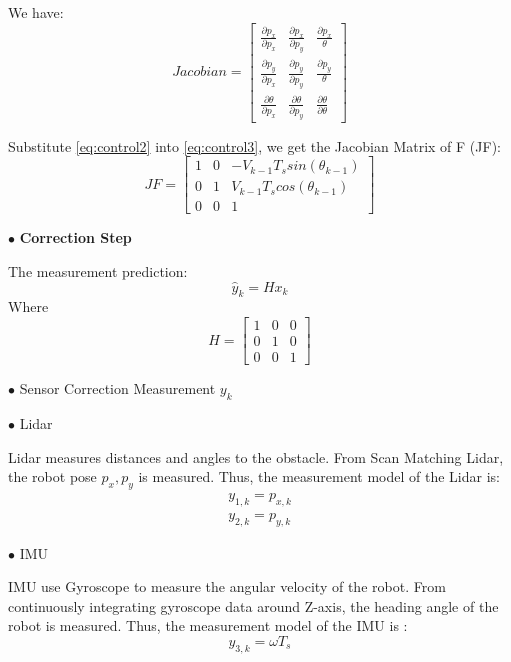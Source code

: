 We have:
\begin{equation} \label{eq:control3}
Jacobian = \begin{bmatrix}
\frac{\partial p_x}{\partial p_x} & \frac{\partial p_x}{\partial p_y} & \frac{\partial p_x}{\theta}\\
\frac{\partial p_y}{\partial p_x} & \frac{\partial p_y}{\partial p_y} & \frac{\partial p_y}{\theta}\\
\frac{\partial \theta}{\partial p_x}       & \frac{\partial \theta}{\partial p_y}       & \frac{\partial \theta}{\partial \theta}
\end{bmatrix}
\end{equation}

Substitute \ref{eq:control2} into \ref{eq:control3}, we get the Jacobian Matrix of F (JF):
\begin{equation}
JF = 
\begin{bmatrix}
1 & 0 & -V_{k-1} T_s sin(\theta_{k-1})\\
0 & 1 &  V_{k-1} T_s cos(\theta_{k-1})\\
0 & 0 &            1
\end{bmatrix}
\end{equation}

$\bullet$ \textbf{Correction Step}\par
The measurement prediction:
\begin{equation}
\hat{y}_k = H x_k
\end{equation}
Where
\begin{equation}
H = \begin{bmatrix}
1 & 0 & 0\\
0 & 1 & 0\\
0 & 0 & 1
\end{bmatrix}
\end{equation}

$\bullet$ Sensor Correction Measurement \(y_k\)\par
$\bullet$ Lidar\par
Lidar measures distances and angles to the obstacle. From Scan Matching Lidar, the robot pose \(p_x,p_y\) is measured. Thus, the measurement model of the Lidar is:
\begin{equation}
\begin{split}
y_{1,k} = p_{x,k}\\
y_{2,k} = p_{y,k}
\end{split}
\end{equation}

$\bullet$ IMU\par
IMU use Gyroscope to measure the angular velocity of the robot. From continuously integrating gyroscope data around Z-axis, the heading angle of the robot is measured. Thus, the measurement model of the IMU is :
\begin{equation}
y_{3,k} = \omega T_s
\end{equation}

